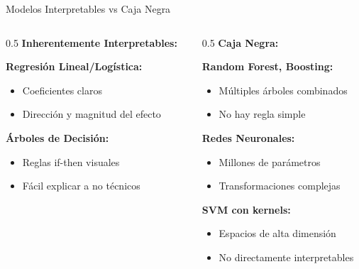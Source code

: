 \documentclass[aspectratio=169]{beamer}
\begin{document}
\begin{frame}{Modelos Interpretables vs Caja Negra}
\begin{columns}
\begin{column}{0.5\textwidth}
\textbf{Inherentemente Interpretables:}

\vspace{0.2cm}

\textbf{Regresión Lineal/Logística:}
\begin{itemize}
\item Coeficientes claros
\item Dirección y magnitud del efecto
\end{itemize}

\vspace{0.2cm}

\textbf{Árboles de Decisión:}
\begin{itemize}
\item Reglas if-then visuales
\item Fácil explicar a no técnicos
\end{itemize}
\end{column}

\begin{column}{0.5\textwidth}
\textbf{Caja Negra:}

\vspace{0.2cm}

\textbf{Random Forest, Boosting:}
\begin{itemize}
\item Múltiples árboles combinados
\item No hay regla simple
\end{itemize}

\vspace{0.2cm}

\textbf{Redes Neuronales:}
\begin{itemize}
\item Millones de parámetros
\item Transformaciones complejas
\end{itemize}

\vspace{0.2cm}

\textbf{SVM con kernels:}
\begin{itemize}
\item Espacios de alta dimensión
\item No directamente interpretables
\end{itemize}
\end{column}
\end{columns}
\end{frame}
\end{document}
